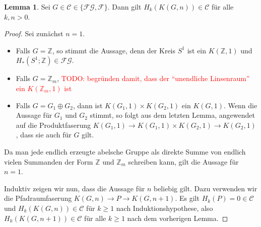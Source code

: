 \documentclass[11pt, a4paper, german]{article}
\theoremstyle{definition}
\newtheorem*{lem}{Lemma}
\theoremstyle{remark}
\newcommand{\TODO}[1]{\textcolor{red}{TODO: #1}} %
\newcommand{\Z}{\mathbb{Z}} %
\newcommand{\SC}{\mathcal{C}} %
\newcommand{\FG}{\mathcal{FG}} %
\newcommand{\F}{\mathcal{F}} %
\begin{document}
\begin{lem}
  Sei $G \in \SC \in \{ \FG, \F \}$.
  Dann gilt $H_k(K(G, n)) \in \SC$ für alle $k, n > 0$.
\end{lem}

\begin{proof}
  Sei zunächst $n=1$.
  \begin{itemize}
    \item Falls $G = \Z$, so stimmt die Aussage, denn der Kreis $S^1$ ist ein $K(\Z, 1)$ und $H_*(S^1; \Z) \in \FG$.
    \item Falls $G = \Z_m$, \TODO{begründen damit, dass der "`unendliche Linsenraum"' ein $K(\Z_m, 1)$ ist}
    \item Falls $G = G_1 \oplus G_2$, dann ist $K(G_1, 1) \times K(G_2, 1)$ ein $K(G, 1)$.
    Wenn die Aussage für $G_1$ und $G_2$ stimmt, so folgt aus dem letzten Lemma, angewendet auf die Produktfaserung $K(G_1, 1) \to K(G_1, 1) \times K(G_2, 1) \to K(G_2, 1)$, dass sie auch für $G$ gilt.
  \end{itemize}
  Da man jede endlich erzeugte abelsche Gruppe als direkte Summe von endlich vielen Summanden der Form $\Z$ und $\Z_m$ schreiben kann, gilt die Aussage für $n=1$.

  Induktiv zeigen wir nun, dass die Aussage für $n$ beliebig gilt.
  Dazu verwenden wir die Pfadraumfaserung $K(G, n) \to P \to K(G, n{+}1)$.
  Es gilt $H_k(P) = 0 \in \SC$ und $H_k(K(G, n)) \in \SC$ für $k \geq 1$ nach Induktionshypothese, also $H_k(K(G, n{+}1)) \in \SC$ für alle $k \geq 1$ nach dem vorherigen Lemma.
\end{proof}
\end{document}
